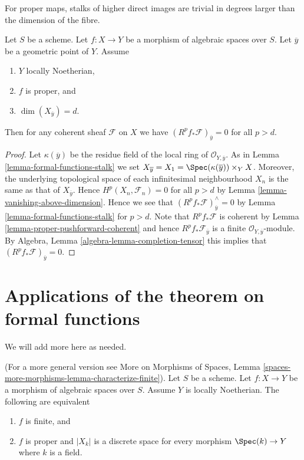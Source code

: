 \begin{lemma}
\label{lemma-higher-direct-images-zero-above-dimension-fibre}
\begin{slogan}
For proper maps, stalks of higher direct images are trivial in degrees
larger than the dimension of the fibre.
\end{slogan}
Let $S$ be a scheme.
Let $f : X \to Y$ be a morphism of algebraic spaces over $S$.
Let $\overline{y}$ be a geometric point of $Y$.
Assume
\begin{enumerate}
\item $Y$ locally Noetherian,
\item $f$ is proper, and
\item $\dim(X_{\overline{y}}) = d$.
\end{enumerate}
Then for any coherent sheaf $\mathcal{F}$ on $X$ we have
$(R^pf_*\mathcal{F})_{\overline{y}} = 0$ for all $p > d$.
\end{lemma}

\begin{proof}
Let $\kappa(\overline{y})$ be the residue field of the local
ring of $\mathcal{O}_{Y, \overline{y}}$. As in
Lemma \ref{lemma-formal-functions-stalk}
we set $X_{\overline{y}} = X_1 = \Spec(\kappa(\overline{y})) \times_Y X$.
Moreover, the underlying topological space of each infinitesimal
neighbourhood $X_n$ is the same as that of $X_{\overline{y}}$.
Hence $H^p(X_n, \mathcal{F}_n) = 0$ for all $p > d$ by
Lemma \ref{lemma-vanishing-above-dimension}.
Hence we see that $(R^pf_*\mathcal{F})_{\overline{y}}^\wedge = 0$
by Lemma \ref{lemma-formal-functions-stalk} for $p > d$.
Note that $R^pf_*\mathcal{F}$ is coherent by
Lemma \ref{lemma-proper-pushforward-coherent} and
hence $R^pf_*\mathcal{F}_{\overline{y}}$ is a finite
$\mathcal{O}_{Y, \overline{y}}$-module.
By Algebra, Lemma \ref{algebra-lemma-completion-tensor}
this implies that $(R^pf_*\mathcal{F})_{\overline{y}} = 0$.
\end{proof}






\section{Applications of the theorem on formal functions}
\label{section-applications-formal-functions}

\noindent
We will add more here as needed.

\begin{lemma}
\label{lemma-characterize-finite}
(For a more general version see
More on Morphisms of Spaces, Lemma
\ref{spaces-more-morphisms-lemma-characterize-finite}).
Let $S$ be a scheme.
Let $f : X \to Y$ be a morphism of algebraic spaces over $S$.
Assume $Y$ is locally Noetherian.
The following are equivalent
\begin{enumerate}
\item $f$ is finite, and
\item $f$ is proper and $|X_k|$ is a discrete space
for every morphism $\Spec(k) \to Y$ where $k$ is a field.
\end{enumerate}
\end{lemma}

